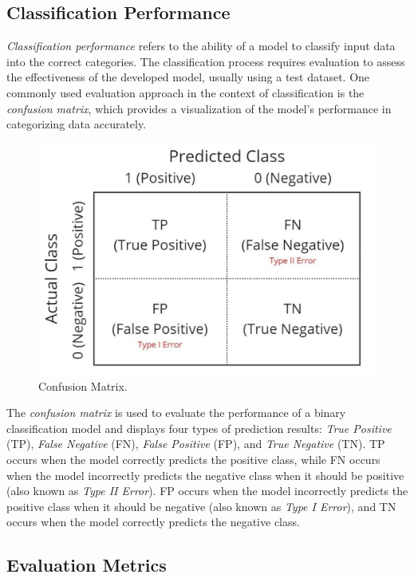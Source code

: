 \subsection{Classification Performance}
\label{subsec:Classification Performance}

\emph{Classification performance} refers to the ability of a model to classify input data into the correct categories. The classification process requires evaluation to assess the effectiveness of the developed model, usually using a test dataset. One commonly used evaluation approach in the context of classification is the \emph{confusion matrix}, which provides a visualization of the model's performance in categorizing data accurately.

\begin{figure}[H]
  \centering
  \includegraphics[scale=0.5]{gambar/Matrix Konfusi.jpg}
  \caption{Confusion Matrix.}
  \label{fig:confusion}
\end{figure}

The \emph{confusion matrix} is used to evaluate the performance of a binary classification model and displays four types of prediction results: \emph{True Positive} (TP), \emph{False Negative} (FN), \emph{False Positive} (FP), and \emph{True Negative} (TN). TP occurs when the model correctly predicts the positive class, while FN occurs when the model incorrectly predicts the negative class when it should be positive (also known as \emph{Type II Error}). FP occurs when the model incorrectly predicts the positive class when it should be negative (also known as \emph{Type I Error}), and TN occurs when the model correctly predicts the negative class.

\subsection{Evaluation Metrics}
\label{subsec:Evaluation Metrics}


